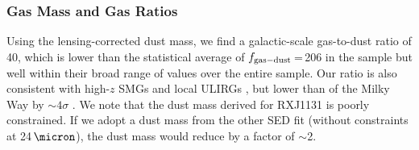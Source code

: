 \documentclass[]{emulateapj}
\begin{document}

\subsubsection{Gas Mass and Gas Ratios}
%
Using the lensing-corrected dust mass, we find a galactic-scale gas-to-dust ratio of
40, which is lower than the statistical average of $f_{\rm gas-dust}$\,=\,206
in the  sample but well within their broad 
range of values over the entire sample. Our ratio is also consistent with 
high-$z$ SMGs 
\citep[]{Bothwell13a} and
local ULIRGs \citep{Wilson08a}, but lower than of the Milky Way by
$\sim 4\sigma$ \citep[ignoring systematic uncertainties;][]{Li01a,Zubko04a,Draine07a}.
We note that the dust mass derived for RXJ1131 is poorly constrained.
If we adopt a dust mass from the other SED fit (\ie without constraints at 24\,$\micron$),
the dust mass would reduce by a factor of $\sim$2. 
\end{document}
